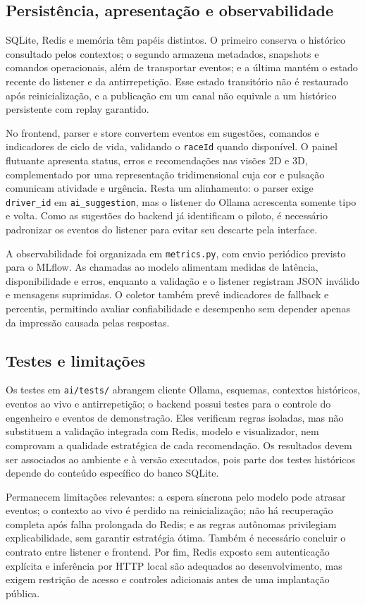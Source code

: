 \subsection{Persistência, apresentação e observabilidade}

SQLite, Redis e memória têm papéis distintos. O primeiro conserva o histórico consultado pelos contextos; o segundo armazena metadados, snapshots e comandos operacionais, além de transportar eventos; e a última mantém o estado recente do listener e da antirrepetição. Esse estado transitório não é restaurado após reinicialização, e a publicação em um canal não equivale a um histórico persistente com replay garantido.

No frontend, parser e store convertem eventos em sugestões, comandos e indicadores de ciclo de vida, validando o \texttt{raceId} quando disponível. O painel flutuante apresenta status, erros e recomendações nas visões 2D e 3D, complementado por uma representação tridimensional cuja cor e pulsação comunicam atividade e urgência. Resta um alinhamento: o parser exige \texttt{driver\_id} em \texttt{ai\_suggestion}, mas o listener do Ollama acrescenta somente tipo e volta. Como as sugestões do backend já identificam o piloto, é necessário padronizar os eventos do listener para evitar seu descarte pela interface.

A observabilidade foi organizada em \texttt{metrics.py}, com envio periódico previsto para o MLflow. As chamadas ao modelo alimentam medidas de latência, disponibilidade e erros, enquanto a validação e o listener registram JSON inválido e mensagens suprimidas. O coletor também prevê indicadores de fallback e percentis, permitindo avaliar confiabilidade e desempenho sem depender apenas da impressão causada pelas respostas.

\subsection{Testes e limitações}

Os testes em \texttt{ai/tests/} abrangem cliente Ollama, esquemas, contextos históricos, eventos ao vivo e antirrepetição; o backend possui testes para o controle do engenheiro e eventos de demonstração. Eles verificam regras isoladas, mas não substituem a validação integrada com Redis, modelo e visualizador, nem comprovam a qualidade estratégica de cada recomendação. Os resultados devem ser associados ao ambiente e à versão executados, pois parte dos testes históricos depende do conteúdo específico do banco SQLite.

Permanecem limitações relevantes: a espera síncrona pelo modelo pode atrasar eventos; o contexto ao vivo é perdido na reinicialização; não há recuperação completa após falha prolongada do Redis; e as regras autônomas privilegiam explicabilidade, sem garantir estratégia ótima. Também é necessário concluir o contrato entre listener e frontend. Por fim, Redis exposto sem autenticação explícita e inferência por HTTP local são adequados ao desenvolvimento, mas exigem restrição de acesso e controles adicionais antes de uma implantação pública.
